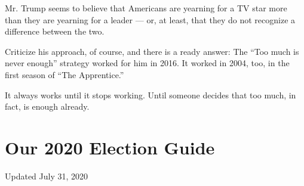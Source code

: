 Mr. Trump seems to believe that Americans are yearning for a TV star
more than they are yearning for a leader --- or, at least, that they do
not recognize a difference between the two.

Criticize his approach, of course, and there is a ready answer: The
``Too much is never enough'' strategy worked for him in 2016. It worked
in 2004, too, in the first season of ``The Apprentice.''

It always works until it stops working. Until someone decides that too
much, in fact, is enough already.

\hypertarget{our-2020-election-guide}{%
\section{Our 2020 Election Guide}\label{our-2020-election-guide}}

Updated July 31, 2020

